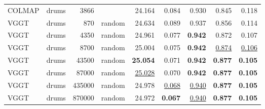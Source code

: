 \begin{table}[H]
\begin{tabular}{llrlrrrrr}
\midrule
COLMAP & drums & 3866 &  & 24.164 & 0.084 & 0.930 & 0.845 & 0.118 \\
VGGT & drums & 870 & random & 24.634 & 0.089 & 0.937 & 0.856 & 0.114 \\
VGGT & drums & 4350 & random & 24.961 & 0.077 & \textbf{0.942} & 0.872 & 0.107 \\
VGGT & drums & 8700 & random & 25.004 & 0.075 & \textbf{0.942} & \underline{0.874} & \underline{0.106} \\
VGGT & drums & 43500 & random & \textbf{25.054} & 0.071 & \textbf{0.942} & \textbf{0.877} & \textbf{0.105} \\
VGGT & drums & 87000 & random & \underline{25.028} & 0.070 & \textbf{0.942} & \textbf{0.877} & \textbf{0.105} \\
VGGT & drums & 435000 & random & 24.978 & \underline{0.068} & \underline{0.940} & \textbf{0.877} & \textbf{0.105} \\
VGGT & drums & 870000 & random & 24.972 & \textbf{0.067} & \underline{0.940} & \textbf{0.877} & \textbf{0.105} \\
\bottomrule
\end{tabular}
\end{table}